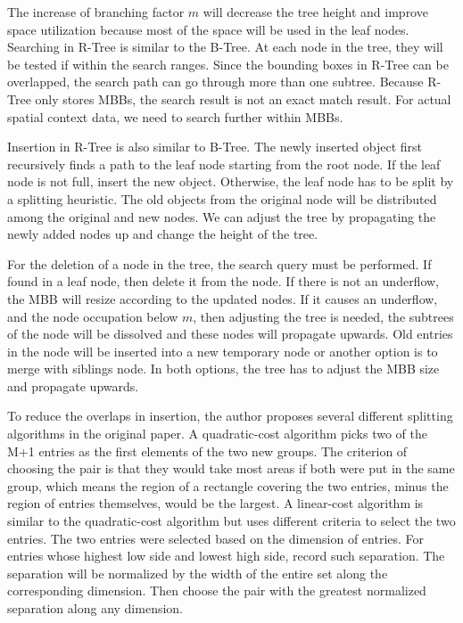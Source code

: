 The increase of branching factor ${m}$ will decrease the tree height and improve space utilization because most of the space will be used in the leaf nodes. Searching in R-Tree is similar to the B-Tree. At each node in the tree, they will be tested if within the search ranges. Since the bounding boxes in R-Tree can be overlapped, the search path can go through more than one subtree. Because R-Tree only stores MBBs, the search result is not an exact match result. For actual spatial context data, we need to search further within MBBs.

Insertion in R-Tree is also similar to B-Tree. The newly inserted object first recursively finds a path to the leaf node starting from the root node. If the leaf node is not full, insert the new object. Otherwise, the leaf node has to be split by a splitting heuristic. The old objects from the original node will be distributed among the original and new nodes. We can adjust the tree by propagating the newly added nodes up and change the height of the tree. 

For the deletion of a node in the tree, the search query must be performed. If found in a leaf node, then delete it from the node. If there is not an underflow, the MBB will resize according to the updated nodes. If it causes an underflow, and the node occupation below ${m}$, then adjusting the tree is needed, the subtrees of the node will be dissolved and these nodes will propagate upwards. Old entries in the node will be inserted into a new temporary node or another option is to merge with siblings node. In both options, the tree has to adjust the MBB size and propagate upwards. 

To reduce the overlaps in insertion, the author proposes several different splitting algorithms in the original paper. A quadratic-cost algorithm picks two of the M+1 entries as the first elements of the two new groups. The criterion of choosing the pair is that they would take most areas if both were put in the same group, which means the region of a rectangle covering the two entries, minus the region of entries themselves, would be the largest. A linear-cost algorithm is similar to the quadratic-cost algorithm but uses different criteria to select the two entries. The two entries were selected based on the dimension of entries. For entries whose highest low side and lowest high side, record such separation. The separation will be normalized by the width of the entire set along the corresponding dimension. Then choose the pair with the greatest normalized separation along any dimension. 

